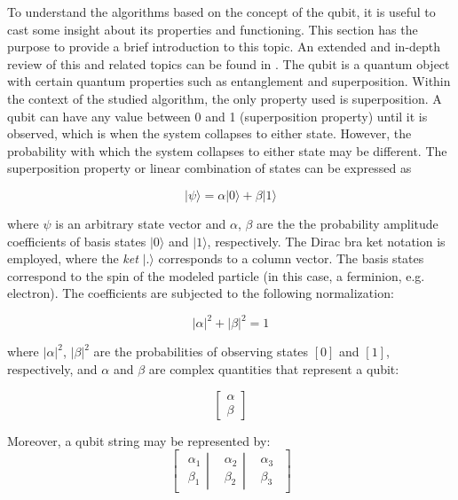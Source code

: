 To understand the algorithms based on the concept of the qubit, it is useful to cast some insight about its properties and functioning.
This section has the purpose to provide a brief introduction to this topic.
An extended and in-depth review of this and related topics can be found in \citet{Lanzagorta2008}.
The qubit is a quantum object with certain quantum properties such as entanglement and superposition.
Within the context of the studied algorithm, the only property used is superposition.
A qubit can have any value between 0 and 1 (superposition property) until it is observed, which is when the system collapses to either state.
However, the probability with which the system collapses to either state  may be different.
The superposition property or linear combination of states can be expressed \cite{Casper2012KMeans} as %


$$
| \psi \rangle = \alpha | 0 \rangle + \beta | 1 \rangle
$$

where $\psi$ is an arbitrary state vector and $\alpha$, $\beta$ are the the probability amplitude coefficients of basis states $| 0 \rangle$ and $| 1 \rangle$, respectively.
The Dirac bra ket notation is employed, where the \emph{ket} $| . \rangle$ corresponds to a column vector.
The basis states correspond to the spin of the modeled particle (in this case, a ferminion, e.g. electron).
The coefficients are subjected to the following normalization:

$$|\alpha|^2 + |\beta|^2 = 1$$

where $|\alpha|^2$, $|\beta|^2$ are the probabilities of observing states $[0]$ and $[1]$, respectively, and $\alpha$ and $\beta$ are complex quantities that represent a qubit:

$$\begin{bmatrix}
\alpha \\
\beta
\end{bmatrix}$$

Moreover, a qubit string may be represented by:
$$
\begin{bmatrix}
\left. \begin{matrix}
\alpha_1\\ 
\beta_1
\end{matrix}\right| & \left.\begin{matrix}
\alpha_2\\ 
\beta_2
\end{matrix}\right| & \begin{matrix}
\alpha_3\\ 
\beta_3
\end{matrix}
\end{bmatrix}
$$

